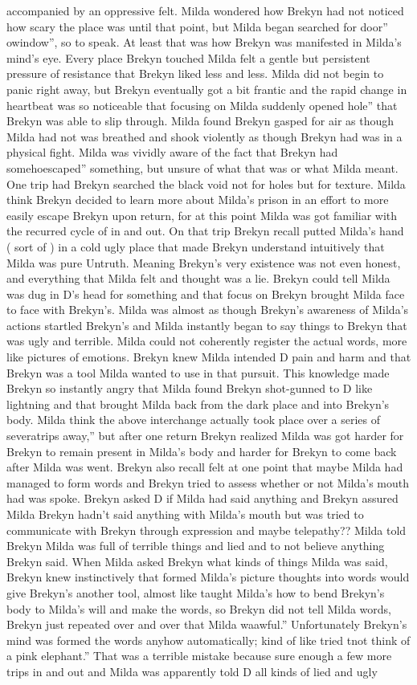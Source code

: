 \documentclass[12pt]{book}
\begin{document}
accompanied by an oppressive felt. Milda wondered how Brekyn had not noticed how scary the place was until that point, but Milda began searched for door'' owindow'', so to speak. At least that was how Brekyn was manifested in Milda's mind's eye. Every place Brekyn touched Milda felt a gentle but persistent pressure of resistance that Brekyn liked less and less. Milda did not begin to panic right away, but Brekyn eventually got a bit frantic and the rapid change in heartbeat was so noticeable that focusing on Milda suddenly opened hole'' that Brekyn was able to slip through. Milda found Brekyn gasped for air as though Milda had not was breathed and shook violently as though Brekyn had was in a physical fight. Milda was vividly aware of the fact that Brekyn had somehoescaped'' something, but unsure of what that was or what Milda meant. One trip had Brekyn searched the black void not for holes but for texture. Milda think Brekyn decided to learn more about Milda's prison in an effort to more easily escape Brekyn upon return, for at this point Milda was got familiar with the recurred cycle of in and out. On that trip Brekyn recall putted Milda's hand ( sort of ) in a cold ugly place that made Brekyn understand intuitively that Milda was pure Untruth. Meaning Brekyn's very existence was not even honest, and everything that Milda felt and thought was a lie. Brekyn could tell Milda was dug in D's head for something and that focus on Brekyn brought Milda face to face with Brekyn's. Milda was almost as though Brekyn's awareness of Milda's actions startled Brekyn's and Milda instantly began to say things to Brekyn that was ugly and terrible. Milda could not coherently register the actual words, more like pictures of emotions. Brekyn knew Milda intended D pain and harm and that Brekyn was a tool Milda wanted to use in that pursuit. This knowledge made Brekyn so instantly angry that Milda found Brekyn shot-gunned to D like lightning and that brought Milda back from the dark place and into Brekyn's body. Milda think the above interchange actually took place over a series of severatrips away,'' but after one return Brekyn realized Milda was got harder for Brekyn to remain present in Milda's body and harder for Brekyn to come back after Milda was went. Brekyn also recall felt at one point that maybe Milda had managed to form words and Brekyn tried to assess whether or not Milda's mouth had was spoke. Brekyn asked D if Milda had said anything and Brekyn assured Milda Brekyn hadn't said anything with Milda's mouth but was tried to communicate with Brekyn through expression and maybe telepathy?? Milda told Brekyn Milda was full of terrible things and lied and to not believe anything Brekyn said. When Milda asked Brekyn what kinds of things Milda was said, Brekyn knew instinctively that formed Milda's picture thoughts into words would give Brekyn's another tool, almost like taught Milda's how to bend Brekyn's body to Milda's will and make the words, so Brekyn did not tell Milda words, Brekyn just repeated over and over that Milda waawful.'' Unfortunately Brekyn's mind was formed the words anyhow automatically; kind of like tried tnot think of a pink elephant.'' That was a terrible mistake because sure enough a few more trips in and out and Milda was apparently told D all kinds of lied and ugly 
\end{document}

